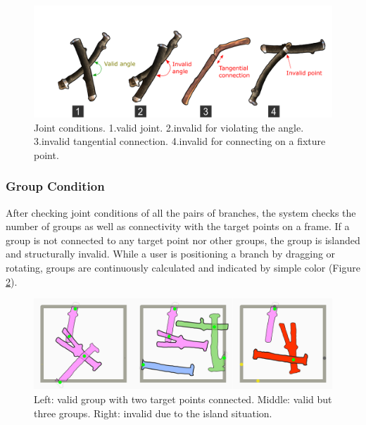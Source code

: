 
\begin{figure}[ht]
  \begin{center}
    \includegraphics[width = 0.4\paperwidth]{images/system/joint_conditions_2.png}
    \caption{Joint conditions. 1.valid joint. 2.invalid for violating the angle. 3.invalid tangential connection. 4.invalid for connecting on a fixture point. }
    \label{fig:joint_condition}
  \end{center}
\end{figure}

\subsubsection*{Group Condition}

After checking joint conditions of all the pairs of branches, the system checks the number of groups as well as connectivity with the target points on a frame.
If a group is not connected to any target point nor other groups, the group is islanded and structurally invalid.
While a user is positioning a branch by dragging or rotating, groups are continuously calculated and indicated by simple color (Figure \ref{fig:group}).

\begin{figure}[ht]
  \begin{center}
    \includegraphics[width = 0.4\paperwidth]{images/interface/groups.jpg}
    \caption{Left: valid group with two target points connected. Middle: valid but three groups. Right: invalid due to the island situation. }
    \label{fig:group}
  \end{center}
\end{figure}



